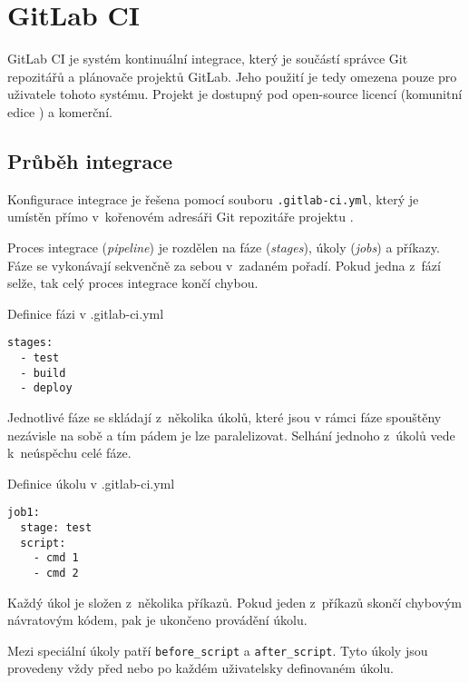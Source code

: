 \section{GitLab CI}

GitLab CI je systém kontinuální integrace, který je součástí správce Git repozitářů a plánovače projektů GitLab.
Jeho použití je tedy omezena pouze pro uživatele tohoto systému.
Projekt je dostupný pod open-source licencí (komunitní edice \cite{gitlab_ce}) a komerční. 

\subsection{Průběh integrace}


Konfigurace integrace je řešena pomocí souboru \verb|.gitlab-ci.yml|, který je umístěn přímo v~kořenovém adresáři Git repozitáře projektu \cite{gitlab_yml}.

Proces integrace (\textit{pipeline}) je rozdělen na fáze (\textit{stages}), úkoly (\textit{jobs}) a příkazy.
Fáze se vykonávají sekvenčně za sebou v~zadaném pořadí.
Pokud jedna z~fází selže, tak celý proces integrace končí chybou.

\begin{listing}[ht]
\caption{Definice fázi v .gitlab-ci.yml}
\begin{verbatim}
stages:
  - test
  - build
  - deploy
\end{verbatim}
\end{listing}

Jednotlivé fáze se skládají z~několika úkolů, které jsou v rámci fáze spouštěny nezávisle na sobě a tím pádem je lze paralelizovat.
Selhání jednoho z~úkolů vede k~neúspěchu celé fáze.

\begin{listing}[ht]
\caption{Definice úkolu v .gitlab-ci.yml}
\begin{verbatim}
job1:
  stage: test
  script:
    - cmd 1
    - cmd 2
\end{verbatim}
\end{listing}

Každý úkol je složen z~několika příkazů.
Pokud jeden z~příkazů skončí chybovým návratovým kódem, pak je ukončeno provádění úkolu.

Mezi speciální úkoly patří \verb|before_script| a \verb|after_script|.
Tyto úkoly jsou provedeny vždy před nebo po každém uživatelsky definovaném úkolu.

